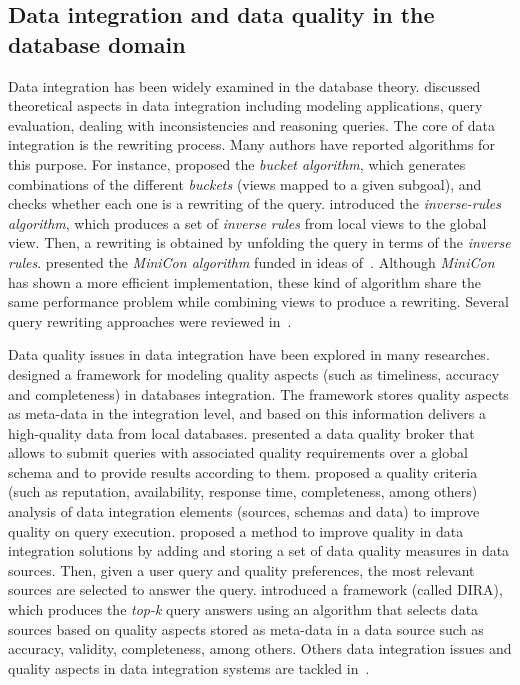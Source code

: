 
\subsection{Data integration and data quality in the database domain}
 
Data integration has been widely examined in the database theory.
\cite{Lenzerini:2002} discussed theoretical aspects in data integration including modeling 
applications, query evaluation, dealing with inconsistencies and reasoning queries.
The core of data integration is the rewriting process.
Many authors have reported algorithms for this purpose. 
For instance, \cite{Levy:1996} proposed the \textit{bucket algorithm}, which generates 
combinations of the different \textit{buckets} (views mapped to a given subgoal), and checks 
whether each one is a rewriting of the query. 
\cite{Duschka:1997} introduced the \textit{inverse-rules algorithm}, which produces a set of
\textit{inverse rules} from local views to the global view. Then, a rewriting is obtained by 
unfolding the query in terms of the \textit{inverse rules}. 
\cite{Pottinger:2001} presented the \textit{MiniCon algorithm} funded in ideas 
of~\cite{Duschka:1997}.
Although \textit{MiniCon} has shown a more efficient implementation, these kind of algorithm
share the same performance problem while combining views to produce a rewriting.
Several query rewriting approaches were reviewed in~\cite{Halevy:2001}.

Data quality issues in data integration have been explored in many researches. 
\cite{Gertz1998} designed a framework for modeling quality aspects
(such as timeliness, accuracy and completeness) in databases integration. The framework
stores quality aspects as meta-data in the integration level, and based on this information
delivers a high-quality data from local databases.
\cite{Scannapieco:2004} presented a data quality broker that allows to submit 
queries with associated quality requirements over a global schema and to 
provide results according to them.
\cite{Batista07} proposed a quality criteria (such as reputation, availability, 
response time, completeness, among others) analysis of data integration elements 
(sources, schemas and data) to improve quality on query execution. 
\cite{Moneim2015} proposed a method to improve quality in data integration solutions
by adding and storing a set of data quality measures in data sources. Then, given a 
user query and quality preferences, the most relevant sources are selected to answer
the query.
\cite{Monem2016} introduced a framework (called DIRA), which produces the \textit{top-k}
query answers using an algorithm that selects data sources based on quality aspects stored
as meta-data in a data source such as accuracy, validity, completeness, among others. 
Others data integration issues and quality aspects in data integration systems are tackled
in~\cite{Batini2006,Angeles2009,Boufares2012}. 

